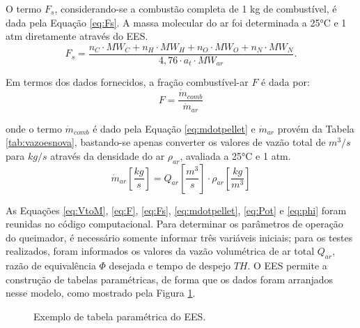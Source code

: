 \noindent O termo $F_s$, considerando-se a combustão completa de 1 kg de combustível, é dada pela Equação \eqref{eq:Fs}. A massa molecular do ar foi determinada a 25°C e 1 atm diretamente através do EES.
\begin{equation} \label{eq:Fs}
F_s = \frac{n_C\cdot MW_C + n_H\cdot MW_H + n_O\cdot MW_O + n_N\cdot MW_N}{4,76\cdot a_t \cdot MW_{ar}}.
\end{equation}

\noindent Em termos dos dados fornecidos, a fração combustível-ar $F$ é dada por:
\begin{equation} \label{eq:F}
F = \frac{\dot{m}_{comb}}{\dot{m}_{ar}}
\end{equation}

\noindent onde o termo $\dot{m}_{comb}$ é dado pela Equação \eqref{eq:mdotpellet} e $\dot{m}_{ar}$ provém da Tabela \ref{tab:vazoesnova}, bastando-se apenas converter os valores de vazão total de $m^3/s$ para $kg/s$ através da densidade do ar $\rho_{ar}$, avaliada a 25°C e 1 atm.
\begin{equation} \label{eq:VtoM}
\dot{m}_{ar} \left[\frac{kg}{s}\right]= {Q}_{ar} \left[\frac{m^3}{s}\right] \cdot \rho_{ar} \left[\frac{kg}{m^3}\right]
\end{equation}

As Equações \eqref{eq:VtoM}, \eqref{eq:F}, \eqref{eq:Fs}, \eqref{eq:mdotpellet}, \eqref{eq:Pot} e \eqref{eq:phi} foram reunidas no código computacional. Para determinar os parâmetros de operação do queimador, é necessário somente informar três variáveis iniciais; para os testes realizados, foram informados os valores da vazão volumétrica de ar total ${Q}_{ar}$, razão de equivalência $\Phi$ desejada e tempo de despejo $TH$. O EES permite a construção de tabelas paramétricas, de forma que os dados foram arranjados nesse modelo, como mostrado pela Figura \ref{fig:tabparam}. 

\begin{figure}[!ht]
	\centering
	\caption{Exemplo de tabela paramétrica do EES.}
	\label{fig:tabparam}
\end{figure}

